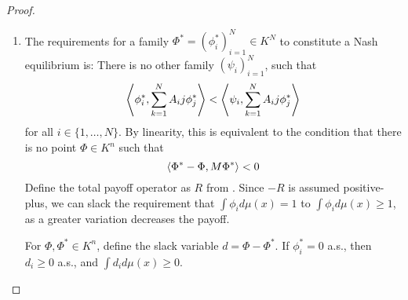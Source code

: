 \begin{proof}
  \begin{enumerate}
    \item
    The requirements for a family $\Phi^*=(\phi_i^*)_{i=1}^N \in K^N$ to constitute a Nash equilibrium is: There is no other family $(\psi_i)_{i=1}^N$, such that
    \begin{equation}
        \ip{\phi_i^*}{\sum_{k=1}^N A_ij \phi_j^*} < \ip{\psi_i}{\sum_{k=1}^N A_ij \phi_j^*}
    \end{equation}
    for all $i\in \{1,\dots,N\}$.
    By linearity, this is equivalent to the condition that there is no point $\Phi \in K^n$ such that
    \begin{equation}
      \left \langle \Phi^*-\Phi,M \Phi^* \right \rangle < 0
    \end{equation}
    Define the total payoff operator as $R$ from . Since $-R$ is assumed positive-plus, we can slack the requirement that $\int \phi_i d\mu(x)=1$ to $\int \phi_i d\mu(x) \geq 1$, as a greater variation decreases the payoff.

    For $\Phi, \Phi^* \in K^n$, define the slack variable $d = \Phi - \Phi^*$. If $\phi_i^* = 0$ a.s., then $d_i \geq 0$ a.s., and $\int d_i d\mu(x) \geq 0$.


\end{enumerate}
\end{proof}
